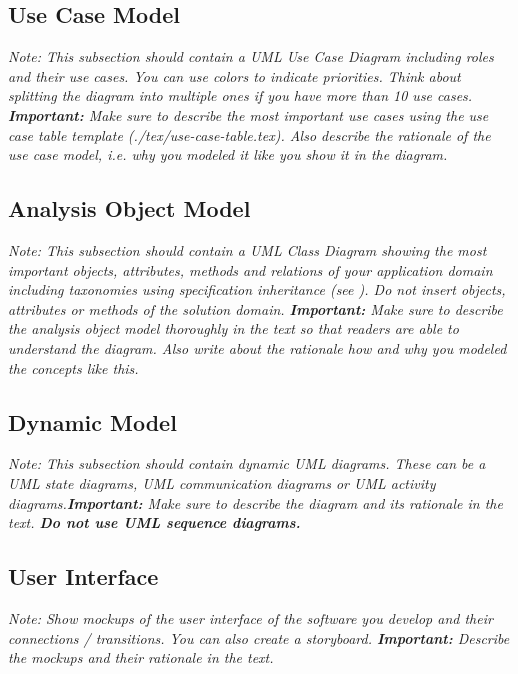 \documentclass[a4paper,12pt,twoside]{report}
\begin{document}
\subsection{Use Case Model}

\textit{Note: This subsection should contain a UML Use Case Diagram including roles and their use cases. You can use colors to indicate priorities. Think about splitting the diagram into multiple ones if you have more than 10 use cases.
\textbf{Important:} Make sure to describe the most important use cases using the use case table template (./tex/use-case-table.tex). Also describe the rationale of the use case model, i.e. why you modeled it like you show it in the diagram.}

\subsection{Analysis Object Model}

\textit{Note: This subsection should contain a UML Class Diagram showing the most important objects, attributes, methods and relations of your application domain including taxonomies using specification inheritance (see \cite{bruegge2004object}). Do not insert objects, attributes or methods of the solution domain.
\textbf{Important:} Make sure to describe the analysis object model thoroughly in the text so that readers are able to understand the diagram. Also write about the rationale how and why you modeled the concepts like this.}

\subsection{Dynamic Model}

\textit{Note: This subsection should contain dynamic UML diagrams. These can be a UML state diagrams, UML communication diagrams or UML activity diagrams.\textbf{Important:} Make sure to describe the diagram and its rationale in the text. \textbf{Do not use UML sequence diagrams.}}

\subsection{User Interface}

\textit{Note: Show mockups of the user interface of the software you develop and their connections / transitions. You can also create a storyboard. \textbf{Important:} Describe the mockups and their rationale in the text.}
\end{document}
